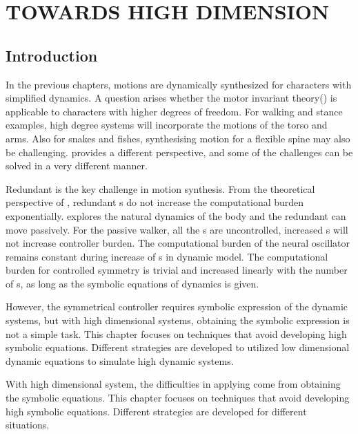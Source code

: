 \chapter{TOWARDS HIGH DIMENSION}
\label{chap:highdor}
\graphicspath{{HiDof/HiDofFigs/EPS/}{HiDof/HiDofFigs/}}
\section{Introduction}
In the previous chapters, motions are dynamically synthesized for characters with simplified dynamics.
A question arises whether the  motor invariant theory(\moit) is applicable to characters with higher degrees of freedom.
For walking and stance examples, high degree systems will incorporate the motions of the torso and arms.
Also for snakes and fishes, synthesising motion for a flexible spine may also be  challenging.
\moit provides a different perspective, and some of the challenges can be solved in a very different manner.



Redundant {\dof} is the key challenge in motion synthesis.
From the theoretical perspective of \moit, redundant {\dof}s do not increase the computational burden exponentially.
\moit explores the natural dynamics of the body and the redundant {\dof} can move passively.
For the passive walker, all the \dof s are uncontrolled, increased {\dof} s will not increase controller burden.
The computational burden of the neural oscillator remains constant during increase of {\dof} s in dynamic model.
The computational burden for controlled symmetry is trivial and increased linearly with the number of {\dof} s, as long as the symbolic equations of dynamics is given.


However, the symmetrical controller requires symbolic expression of the dynamic systems, but with high dimensional systems, obtaining the symbolic expression is not a simple task. 
This chapter focuses on techniques that avoid developing high {\dof} symbolic equations. Different strategies are developed to utilized low dimensional dynamic equations to simulate high dynamic systems.


With high dimensional system,  the difficulties in applying \moit  come from  obtaining the symbolic equations.
This chapter focuses on techniques that avoid developing high \dof symbolic equations.
Different strategies are developed for different situations.

